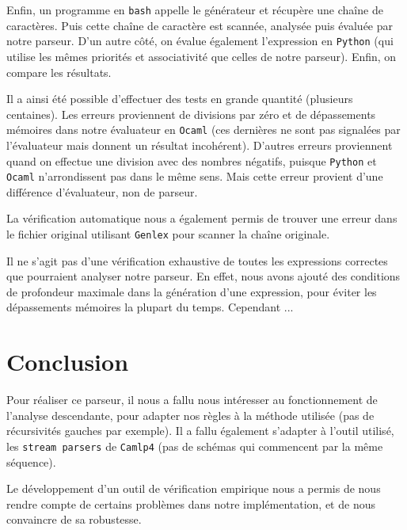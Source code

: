 \documentclass[11pt]{article}
\begin{document}
Enfin, un programme en \texttt{bash} appelle le générateur et récupère une chaîne de caractères. Puis cette chaîne de caractère est scannée, analysée puis évaluée par notre parseur. D'un autre côté, on évalue également l'expression en \texttt{Python} (qui utilise les mêmes priorités et associativité que celles de notre parseur). Enfin, on compare les résultats.

Il a ainsi été possible d'effectuer des tests en grande quantité (plusieurs centaines).
Les erreurs proviennent de divisions par zéro et de dépassements mémoires dans notre évaluateur en \texttt{Ocaml} (ces dernières ne sont pas signalées par l'évaluateur mais donnent un résultat incohérent). D'autres erreurs proviennent quand on effectue une division avec des nombres négatifs, puisque \texttt{Python} et \texttt{Ocaml} n'arrondissent pas dans le même sens. Mais cette erreur provient d'une différence d'évaluateur, non de parseur.

La vérification automatique nous a également permis de trouver une erreur dans le fichier original utilisant \texttt{Genlex} pour scanner la chaîne originale. %





Il ne s'agit pas d'une vérification exhaustive de toutes les expressions correctes que pourraient analyser notre parseur. En effet, nous avons ajouté des conditions de profondeur maximale dans la génération d'une expression, pour éviter les dépassements mémoires la plupart du temps. Cependant ...

\section{Conclusion}
Pour réaliser ce parseur, il nous a fallu nous intéresser au fonctionnement de l'analyse descendante, pour adapter nos règles à la méthode utilisée (pas de récursivités gauches par exemple). Il a fallu également s'adapter à l'outil utilisé, les \texttt{stream parsers} de \texttt{Camlp4} (pas de schémas qui commencent par la même séquence).

Le développement d'un outil de vérification empirique nous a permis de nous rendre compte de certains problèmes dans notre implémentation, et de nous convaincre de sa robustesse.
\end{document}
